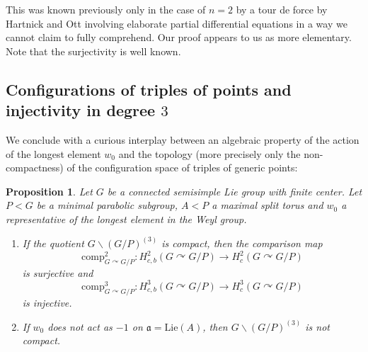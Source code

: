 \documentclass[a4paper]{amsart}
\newtheorem{intro_prop}[intro_thm]{Proposition}
\theoremstyle{definition}
\theoremstyle{remark}
\theoremstyle{TheoremNum}
\begin{document}
This was known previously only in the case of $n=2$ by a tour de force by Hartnick and Ott  \cite{HO} involving elaborate partial differential equations in a way we cannot claim to fully comprehend. Our proof appears to us as more elementary. Note that the surjectivity is well known. 


\subsection*{Configurations of triples of points and injectivity in degree $3$} We conclude with a curious interplay between an algebraic property of the action of the longest element $w_0$ and the topology (more precisely only the non-compactness) of the configuration space of triples of generic points:

\begin{intro_prop}\label{intro prop injective degree 3}
Let $G$ be a connected semisimple Lie group with finite center. Let $P<G$ be a minimal parabolic subgroup, $A<P$ a maximal split torus and $w_0$ a representative of the longest element in the Weyl group. \begin{enumerate}
\item If the quotient $G\backslash (G/P)^{(3)}$ is compact, then the comparison map
$$
\mathrm{comp}^2_{G \curvearrowright G/P}:H^2_{c,b}(G \curvearrowright G/P) \longrightarrow H^2_c(G \curvearrowright G/P)
$$
is surjective and 
$$
\mathrm{comp}^3_{G \curvearrowright G/P}:H^3_{c,b}(G \curvearrowright G/P) \longrightarrow H^3_c(G \curvearrowright G/P)
$$
is injective. 
\item If $w_0$ does not act as $-1$ on $\mathfrak{a}=\mathrm{Lie}(A)$, then $G\backslash (G/P)^{(3)}$ is not compact.
\end{enumerate}
\end{intro_prop}
\end{document}
